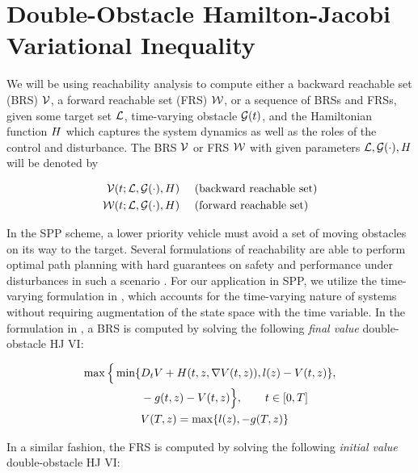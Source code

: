 \section{Double-Obstacle Hamilton-Jacobi Variational Inequality \label{sec:HJIVI}}
We will be using reachability analysis to compute either a backward reachable set (BRS) $\mathcal{V}$, a forward reachable set (FRS) $\mathcal{W}$, or a sequence of BRSs and FRSs, given some target set $\mathcal{L}$, time-varying obstacle $\mathcal{G}(t)$, and the Hamiltonian function $H$ which captures the system dynamics as well as the roles of the control and disturbance. The BRS $\mathcal{V}$ or FRS $\mathcal{W}$ with given parameters $\mathcal{L}, \mathcal{G}(\cdot), H$ will be denoted by

\begin{equation}
\begin{aligned}
\mathcal{V}(t; \mathcal{L}, \mathcal{G}(\cdot), H) &\quad \text{ (backward reachable set)}\\
\mathcal{W}(t; \mathcal{L}, \mathcal{G}(\cdot), H) &\quad \text{ (forward reachable set)}
\end{aligned}
\end{equation}

In the SPP scheme, a lower priority vehicle must avoid a set of moving obstacles on its way to the target. Several formulations of reachability are able to perform optimal path planning with hard guarantees on safety and performance under disturbances in such a scenario \cite{}. For our application in SPP, we utilize the time-varying formulation in \cite{}, which accounts for the time-varying nature of systems without requiring augmentation of the state space with the time variable. In the formulation in \cite{}, a BRS is computed by solving the following \textit{final value} double-obstacle HJ VI:

\begin{equation}
\label{eq:HJIVI_BRS}
\begin{aligned}
\max \Big\{ \min \{&D_t \valfunc + \ham(t, \state, \nabla \valfunc(t, \state)), \fc(\state) - \valfunc(t, \state) \}, \\
&-\obsfunc(t, \state) - \valfunc(t, \state) \Big\}, \qquad t \in [0, T] \\
&\valfunc(T, \state) = \max\{\fc(\state), -\obsfunc(T, \state)\}
\end{aligned}
\end{equation}

In a similar fashion, the FRS is computed by solving the following \textit{initial value} double-obstacle HJ VI:

